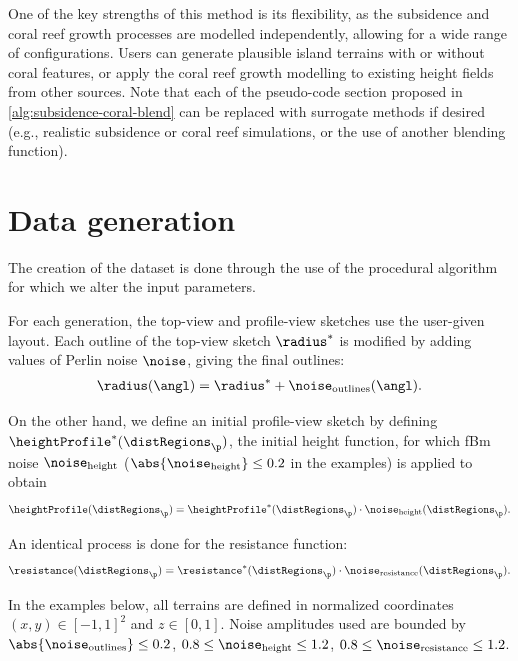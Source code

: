 One of the key strengths of this method is its flexibility, as the subsidence and coral reef growth processes are modelled independently, allowing for a wide range of configurations. Users can generate plausible island terrains with or without coral features, or apply the coral reef growth modelling to existing height fields from other sources. Note that each of the pseudo-code section proposed in \cref{alg:subsidence-coral-blend} can be replaced with surrogate methods if desired (e.g., realistic subsidence or coral reef simulations, or the use of another blending function).


\section{Data generation}
\label{sec:coral-island-dataset-generation}

The creation of the dataset is done through the use of the procedural algorithm for which we alter the input parameters.

For each generation, the top-view and profile-view sketches use the user-given layout. Each outline of the top-view sketch $\radius^*$ is modified by adding values of Perlin noise $\noise$, giving the final outlines:
\begin{align*}
    \radius(\angl) = \radius^* + \noise_\text{outlines}(\angl).
\end{align*}

On the other hand, we define an initial profile-view sketch by defining $\heightProfile^*(\distRegions_\p)$, the initial height function, for which fBm noise $\noise_\text{height}$ ($\abs{\noise_\text{height}} \leq 0.2$ in the examples) is applied to obtain
\begin{align*}
    \heightProfile(\distRegions_\p) = \heightProfile^*(\distRegions_\p) \cdot \noise_\text{height}(\distRegions_\p).
\end{align*}

An identical process is done for the resistance function:
\begin{align*}
    \resistance(\distRegions_\p) = \resistance^*(\distRegions_\p) \cdot \noise_\text{resistance}(\distRegions_\p).
\end{align*}

In the examples below, all terrains are defined in normalized coordinates $(x, y) \in [-1, 1]^2$ and $z \in [0, 1]$. Noise amplitudes used are bounded by $\abs{\noise_\text{outlines}} \leq 0.2$, $0.8 \leq \noise_\text{height} \leq 1.2$, $0.8 \leq \noise_\text{resistance} \leq 1.2$.

